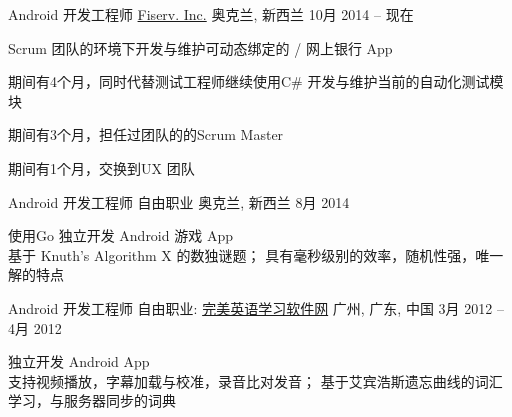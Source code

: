 
\begin{cventries}
	\cventry
	{Android 开发工程师}
	{\href{https://www.fiserv.com/about.aspx}{Fiserv. Inc.}}
	{奥克兰, \enskip 新西兰}
	{10月 2014 – 现在}
	{
		\begin{cvitems}
			\item {Scrum 团队的环境下开发与维护可动态绑定的 \href{https://play.google.com/store/apps/details?id=com.fiserv.touchbankingasp&hl=en}{\color{deepblue}{Android}}/\href{https://itunes.apple.com/us/app/touchbanking/id386678211?mt=8}{\color{deepblue}{iPhone}} 网上银行 App}
			\item {期间有4个月，同时代替测试工程师继续使用C\# 开发与维护当前的自动化测试模块}
			\item {期间有3个月，担任过团队的的Scrum Master}
			\item {期间有1个月，交换到UX 团队}
		\end{cvitems}
	}
\end{cventries}

\begin{cventries}
	\cventry
	{Android 开发工程师}
	{自由职业}
	{奥克兰, \enskip 新西兰}
	{8月 2014}
	{
		\begin{cvitems}
			\item {使用Go 独立开发 Android \href{https://play.google.com/store/apps/details?id=com.gmail.jiangyang5157.sudoku}{\color{deepblue}{数独}} 游戏 App\\
			基于 Knuth’s Algorithm X 的数独谜题；
			具有毫秒级别的效率，随机性强，唯一解的特点}
		\end{cvitems}
	}
\end{cventries}

\begin{cventries}
	\cventry
	{Android 开发工程师}
	{自由职业: \href{http://www.english119.cn}{完美英语学习软件网}}
	{广州, \enskip 广东, \enskip 中国}
	{3月 2012 – 4月 2012}
	{
		\begin{cvitems}
			\item {独立开发 Android \href{http://shouji.baidu.com/software/11415668.html}{\color{deepblue}{完美英语}} App\\
				支持视频播放，字幕加载与校准，录音比对发音；
				基于艾宾浩斯遗忘曲线的词汇学习，与服务器同步的词典}
		\end{cvitems}
	}
\end{cventries}

